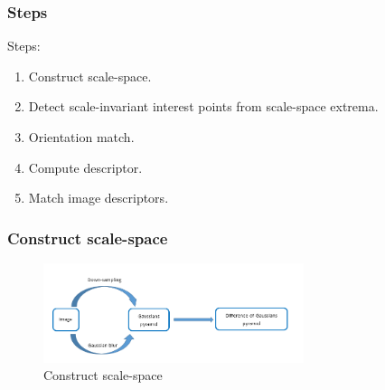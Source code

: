 \documentclass[notheorems, serif, table, compress]{beamer}  %
\begin{document}
\begin{frame}[fragile]
\frametitle{Steps}

Steps:
\begin{enumerate}
\item {\color{red}Construct scale-space.}

\item Detect scale-invariant interest points from scale-space extrema. %

\item {\color{red}Orientation match}.%

\item {\color{red}Compute descriptor.}%

\item Match image descriptors.%
\end{enumerate}
\end{frame}
\begin{frame}[fragile]
\frametitle{Construct scale-space}%

\begin{figure}[!ht]
  \centering\includegraphics[width=3in]{pyramid.png}
  \caption{Construct scale-space}
 \label{step}
  \end{figure}

\end{frame}
\end{document}
